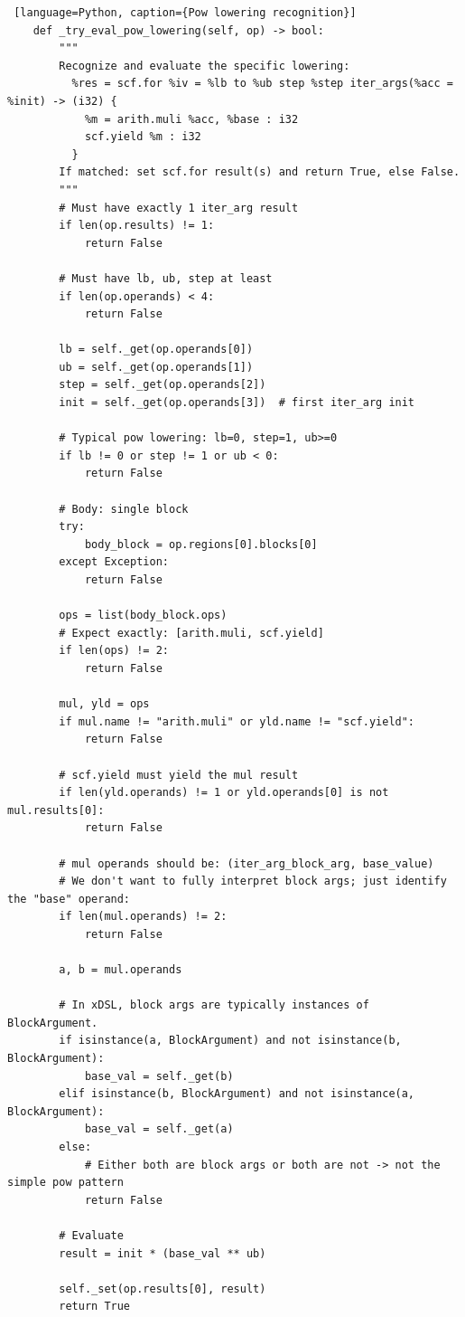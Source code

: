 \documentclass[../main.tex]{subfiles}
\begin{document}
\begin{lstlisting} [language=Python, caption={Pow lowering recognition}]
    def _try_eval_pow_lowering(self, op) -> bool:
        """
        Recognize and evaluate the specific lowering:
          %res = scf.for %iv = %lb to %ub step %step iter_args(%acc = %init) -> (i32) {
            %m = arith.muli %acc, %base : i32
            scf.yield %m : i32
          }
        If matched: set scf.for result(s) and return True, else False.
        """
        # Must have exactly 1 iter_arg result
        if len(op.results) != 1:
            return False

        # Must have lb, ub, step at least
        if len(op.operands) < 4:
            return False

        lb = self._get(op.operands[0])
        ub = self._get(op.operands[1])
        step = self._get(op.operands[2])
        init = self._get(op.operands[3])  # first iter_arg init

        # Typical pow lowering: lb=0, step=1, ub>=0
        if lb != 0 or step != 1 or ub < 0:
            return False

        # Body: single block
        try:
            body_block = op.regions[0].blocks[0]
        except Exception:
            return False

        ops = list(body_block.ops)
        # Expect exactly: [arith.muli, scf.yield]
        if len(ops) != 2:
            return False

        mul, yld = ops
        if mul.name != "arith.muli" or yld.name != "scf.yield":
            return False

        # scf.yield must yield the mul result
        if len(yld.operands) != 1 or yld.operands[0] is not mul.results[0]:
            return False

        # mul operands should be: (iter_arg_block_arg, base_value)
        # We don't want to fully interpret block args; just identify the "base" operand:
        if len(mul.operands) != 2:
            return False

        a, b = mul.operands

        # In xDSL, block args are typically instances of BlockArgument.
        if isinstance(a, BlockArgument) and not isinstance(b, BlockArgument):
            base_val = self._get(b)
        elif isinstance(b, BlockArgument) and not isinstance(a, BlockArgument):
            base_val = self._get(a)
        else:
            # Either both are block args or both are not -> not the simple pow pattern
            return False

        # Evaluate
        result = init * (base_val ** ub)

        self._set(op.results[0], result)
        return True
\end{lstlisting}
\end{document}
